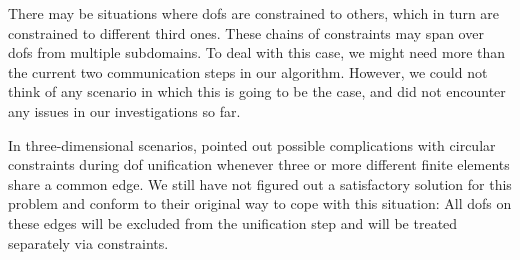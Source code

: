 There may be situations where \glspl{dof} are constrained to others, which in turn are constrained to different third ones. These chains of constraints may span over \glspl{dof} from multiple subdomains. To deal with this case, we might need more than the current two communication steps in our algorithm. However, we could not think of any scenario in which this is going to be the case, and did not encounter any issues in our investigations so far.

In three-dimensional scenarios, \textcite[Sec.~4.6]{bangerth2009} pointed out possible complications with circular constraints during \gls{dof} unification whenever three or more different finite elements share a common edge. We still have not figured out a satisfactory solution for this problem and conform to their original way to cope with this situation: All \glspl{dof} on these edges will be excluded from the unification step and will be treated separately via constraints.